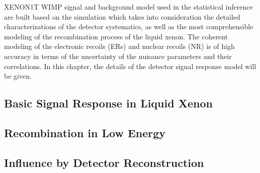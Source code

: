 


XENON1T WIMP signal and background model used in the statistical inference are built based on the simulation which takes into consideration the detailed characterizations of the detector systematics, as well as the most comprehensible modeling of the recombination process of the liquid xenon.
The coherent modeling of the electronic recoils (ERs) and nuclear recoils (NR) is of high accuracy in terms of the uncertainty of the nuisance parameters and their correlations.
In this chapter, the details of the detector signal response model will be given.

\subsection{Basic Signal Response in Liquid Xenon}


\subsection{Recombination in Low Energy}


\subsection{Influence by Detector Reconstruction}
